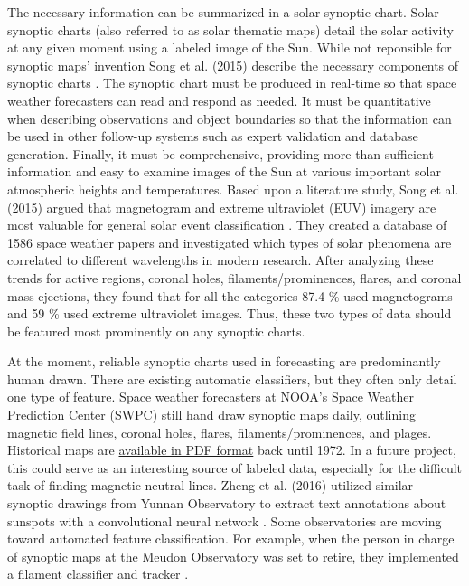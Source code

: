 \documentclass[twoside]{report}
\begin{document}
The necessary information can be summarized in a solar synoptic chart. Solar synoptic charts (also referred to as solar thematic maps) detail the solar activity at any given moment using a labeled image of the Sun. While not reponsible for synoptic maps' invention Song et al. (2015)  describe the necessary components of synoptic charts \cite{song:2015}. The synoptic chart must be produced in real-time so that space weather forecasters can read and respond as needed. It must be quantitative when describing observations and object boundaries so that the information can be used in other follow-up systems such as expert validation and database generation. Finally, it must be comprehensive, providing more than sufficient information and easy to examine images of the Sun at various important solar atmospheric heights and temperatures. Based upon a literature study, Song et al. (2015) argued that magnetogram and extreme ultraviolet (EUV) imagery are most valuable for general solar event classification \cite{song:2015}. They created a database of 1586 space weather papers and investigated which types of solar phenomena are correlated to different wavelengths in modern research. After analyzing these trends for active regions, coronal holes, filaments/prominences, flares, and coronal mass ejections, they found that for all the categories 87.4 \% used magnetograms and 59 \% used extreme ultraviolet images. Thus, these two types of data should be featured most prominently on any synoptic charts.

At the moment, reliable synoptic charts used in forecasting are predominantly human drawn. There are existing automatic classifiers, but they often only detail one type of feature. Space weather forecasters at NOOA's Space Weather Prediction Center (SWPC) still hand draw synoptic maps daily, outlining magnetic field lines, coronal holes, flares, filaments/prominences, and plages. Historical maps are \href{http://www.swpc.noaa.gov/products/solar-synoptic-map}{available in PDF format} back until 1972. In a future project, this could serve as an interesting source of labeled data, especially for the difficult task of finding magnetic neutral lines. Zheng et al. (2016) utilized similar synoptic drawings from Yunnan Observatory to extract text annotations about sunspots with a convolutional neural network \cite{zheng:2016}. Some observatories are moving toward automated feature classification. For example, when the person in charge of synoptic maps at the Meudon Observatory was set to retire, they implemented a filament classifier and tracker \cite{meudon:2007}. 
\end{document}
